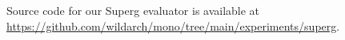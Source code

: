 \documentclass[conference]{IEEEtran}
\begin{document}
Source code for our Superg evaluator is available at \url{https://github.com/wildarch/mono/tree/main/experiments/superg}.







\end{document}
